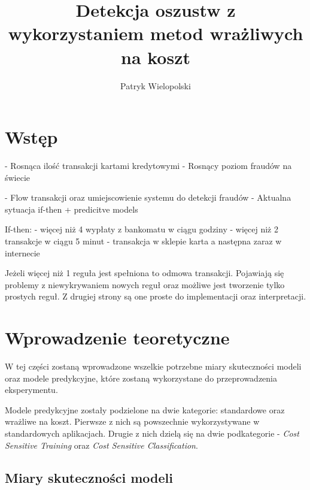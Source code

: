 \documentclass{book}
\title{Detekcja oszustw z wykorzystaniem metod wrażliwych na koszt}
\author{Patryk Wielopolski}
\begin{document}
	
	\newcommand{\htx}{h_{\theta}(\boldsymbol{x_i})}
	\newcommand{\es}{\mathcal{S}}
	\newcommand{\ef}{\mathcal{F}}
	\newcommand{\iks}{\boldsymbol{x}}
	\newcommand{\bes}{\boldsymbol{S}}
	\newcommand{\yht}[1]{y_i^{(#1)}}
	
	\newenvironment{talign}
	{\align}
	{\endalign}
	
	\newenvironment{talign*}
	{\csname align*\endcsname}
	{\endalign}

\maketitle

\chapter{Wstęp}
	- Rosnąca ilość transakcji kartami kredytowymi
	- Rosnący poziom fraudów na świecie
	
	- Flow transakcji oraz umiejscowienie systemu do detekcji fraudów
	- Aktualna sytuacja if-then + predicitve models
	
	If-then:
	- więcej niż 4 wypłaty z bankomatu w ciągu godziny
	- więcej niż 2 transakcje w ciągu 5 minut
	- transakcja w sklepie karta a następna zaraz w internecie
	
	Jeżeli więcej niż 1 reguła jest spełniona to odmowa transakcji. Pojawiają się problemy z niewykrywaniem nowych reguł oraz możliwe jest tworzenie tylko prostych reguł. Z drugiej strony są one proste do implementacji oraz interpretacji.
	

\chapter{Wprowadzenie teoretyczne}

W tej części zostaną wprowadzone wszelkie potrzebne miary skuteczności modeli oraz modele predykcyjne, które zostaną wykorzystane do przeprowadzenia eksperymentu. 

Modele predykcyjne zostały podzielone na dwie kategorie: standardowe oraz wrażliwe na koszt. Pierwsze z nich są powszechnie wykorzystywane w standardowych aplikacjach. Drugie z nich dzielą się na dwie podkategorie - \textit{Cost Sensitive Training} oraz \textit{Cost Sensitive Classification}.

\section{Miary skuteczności modeli}
\end{document}
